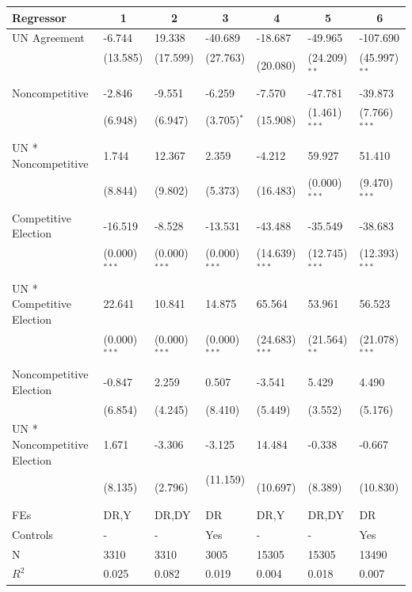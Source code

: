 %
\begin{tabular*}{\textwidth}{@{\extracolsep{\fill}}lllllll}\hline\hline
\multicolumn{1}{l}{Regressor}&\multicolumn{1}{c}{1}&\multicolumn{1}{c}{2}&\multicolumn{1}{c}{3}&\multicolumn{1}{c}{4}&\multicolumn{1}{c}{5}&\multicolumn{1}{c}{6}\tabularnewline
\hline
UN Agreement&-6.744&19.338&-40.689&-18.687&-49.965&-107.690\tabularnewline
&{\scriptsize (13.585)$^{}$}&{\scriptsize (17.599)$^{}$}&{\scriptsize (27.763)$^{}$}&{\scriptsize (20.080)$^{}$}&{\scriptsize (24.209)$^{**}$}&{\scriptsize (45.997)$^{**}$}\tabularnewline
Noncompetitive&-2.846&-9.551&-6.259&-7.570&-47.781&-39.873\tabularnewline
&{\scriptsize (6.948)$^{}$}&{\scriptsize (6.947)$^{}$}&{\scriptsize (3.705)$^{*}$}&{\scriptsize (15.908)$^{}$}&{\scriptsize (1.461)$^{***}$}&{\scriptsize (7.766)$^{***}$}\tabularnewline
UN * Noncompetitive&1.744&12.367&2.359&-4.212&59.927&51.410\tabularnewline
&{\scriptsize (8.844)$^{}$}&{\scriptsize (9.802)$^{}$}&{\scriptsize (5.373)$^{}$}&{\scriptsize (16.483)$^{}$}&{\scriptsize (0.000)$^{***}$}&{\scriptsize (9.470)$^{***}$}\tabularnewline
Competitive Election&-16.519&-8.528&-13.531&-43.488&-35.549&-38.683\tabularnewline
&{\scriptsize (0.000)$^{***}$}&{\scriptsize (0.000)$^{***}$}&{\scriptsize (0.000)$^{***}$}&{\scriptsize (14.639)$^{***}$}&{\scriptsize (12.745)$^{***}$}&{\scriptsize (12.393)$^{***}$}\tabularnewline
UN * Competitive Election&22.641&10.841&14.875&65.564&53.961&56.523\tabularnewline
&{\scriptsize (0.000)$^{***}$}&{\scriptsize (0.000)$^{***}$}&{\scriptsize (0.000)$^{***}$}&{\scriptsize (24.683)$^{***}$}&{\scriptsize (21.564)$^{**}$}&{\scriptsize (21.078)$^{***}$}\tabularnewline
Noncompetitive Election&-0.847&2.259&0.507&-3.541&5.429&4.490\tabularnewline
&{\scriptsize (6.854)$^{}$}&{\scriptsize (4.245)$^{}$}&{\scriptsize (8.410)$^{}$}&{\scriptsize (5.449)$^{}$}&{\scriptsize (3.552)$^{}$}&{\scriptsize (5.176)$^{}$}\tabularnewline
UN * Noncompetitive Election&1.671&-3.306&-3.125&14.484&-0.338&-0.667\tabularnewline
&{\scriptsize (8.135)$^{}$}&{\scriptsize (2.796)$^{}$}&{\scriptsize (11.159)$^{}$}&{\scriptsize (10.697)$^{}$}&{\scriptsize (8.389)$^{}$}&{\scriptsize (10.830)$^{}$}\tabularnewline
FEs&DR,Y&DR,DY&DR&DR,Y&DR,DY&DR\tabularnewline
Controls&-&-&Yes&-&-&Yes\tabularnewline
N&3310&3310&3005&15305&15305&13490\tabularnewline
$R^2$&0.025&0.082&0.019&0.004&0.018&0.007\tabularnewline
\hline
\end{tabular*}

